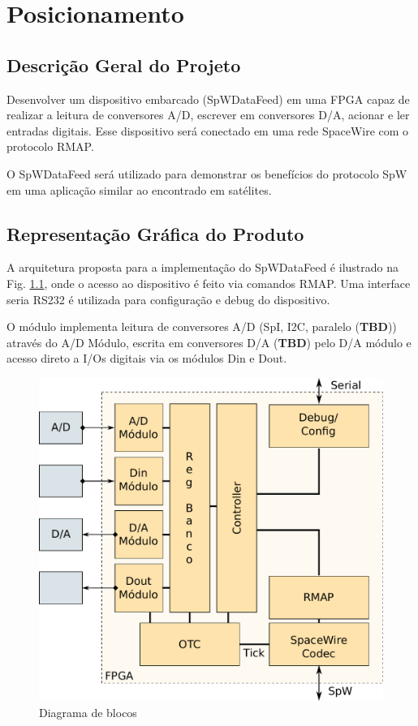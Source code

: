 \chapter{Posicionamento}

\section{Descrição Geral do Projeto}

Desenvolver um dispositivo embarcado (SpWDataFeed) em uma FPGA capaz de realizar a leitura de conversores A/D, escrever em conversores D/A, acionar e ler entradas digitais. Esse dispositivo será conectado em uma rede SpaceWire com o protocolo RMAP.

O SpWDataFeed será utilizado para demonstrar os benefícios do protocolo SpW em uma aplicação similar ao encontrado em satélites.

\section{Representação Gráfica do Produto}

A arquitetura proposta para a implementação do SpWDataFeed é ilustrado na Fig. \ref{fig:arch}, onde o acesso ao dispositivo é feito via comandos RMAP. Uma interface seria RS232 é utilizada para configuração e debug do dispositivo. 

O módulo implementa leitura de conversores A/D (SpI, I2C, paralelo (\textbf{TBD})) através do A/D Módulo, escrita em conversores D/A (\textbf{TBD}) pelo D/A módulo e acesso direto a I/Os digitais via os módulos Din e Dout.

\begin{figure}[ht!]
	\centering
	\includegraphics[width=0.8\linewidth]{./figs/arch}
	\caption{Diagrama de blocos}
	\label{fig:arch}
\end{figure}

